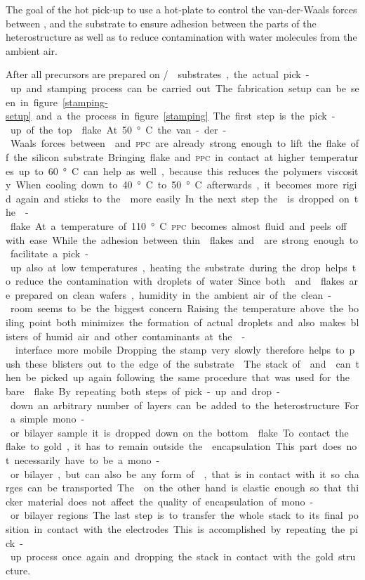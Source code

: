 The goal of the hot pick-up to use a hot-plate to control the van-der-Waals forces between \hbn, \tmds and the substrate to ensure adhesion between the parts of the heterostructure as well as to reduce contamination with water molecules from the ambient air.

After all precursors are prepared on \si/\sio substrates, the actual pick-up and stamping process can be carried out. The fabrication setup can be seen in figure \ref{stamping-setup} and a the process in figure \ref{stamping}. The first step is the pick-up of the top \hbng flake. At 50°C the van-der-Waals forces between \hbng and \textsc{ppc} are already strong enough to lift the flake off the silicon substrate. Bringing flake and \textsc{ppc} in contact at higher temperatures up to 60°C can help as well, because this reduces the polymers viscosity. When cooling down to 40°C to 50°C afterwards, it becomes more rigid again and sticks to the \hbng more easily. In the next step the \hbng is dropped on the \tmd-flake. At a temperature of 110°C \textsc{ppc} becomes almost fluid and peels off \hbng with ease. While the adhesion between thin \tmdg flakes and \hbng are strong enough to facilitate a pick-up also at low temperatures, heating the substrate during the drop helps to reduce the contamination with droplets of water. Since both \tmdg and \hbng flakes are prepared on clean wafers, humidity in the ambient air of the clean-room seems to be the biggest concern. Raising the temperature above the boiling point both minimizes the formation of actual droplets and also makes blisters of humid air and other contaminants at the \hbn-\tmdg interface more mobile. Dropping the stamp very slowly therefore helps to push these blisters out to the edge of the substrate \cite{pizzocchero_hot_2016}. The stack of \tmdg and \hbng can then be picked up again following the same procedure that was used for the bare \hbng flake. By repeating both steps of pick-up and drop-down an arbitrary number of layers can be added to the heterostructure. For a simple mono- or bilayer sample it is dropped down on the bottom \hbng flake. To contact the \tmdg flake to gold, it has to remain outside the \hbng encapsulation. This part does not necessarily have to be a mono- or bilayer, but can also be any form of \tmd, that is in contact with it so charges can be transported. The \hbng on the other hand is elastic enough so that thicker material does not affect the quality of encapsulation of mono- or bilayer regions.

The last step is to transfer the whole stack to its final position in contact with the electrodes. This is accomplished by repeating the pick-up process once again and dropping the stack in contact with the gold structure.

